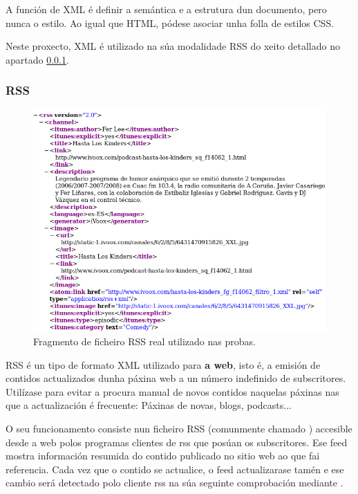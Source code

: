 A función de XML é definir a semántica e a estrutura dun documento, pero nunca o estilo. Ao igual que HTML, pódese asociar unha folla de estilos CSS.

Neste proxecto, XML é utilizado na súa modalidade RSS do xeito detallado no apartado \ref{rss}.

\subsubsection{RSS}
\label{rss}

\begin{figure}[h]
	\centering
	\includegraphics[scale=0.6,keepaspectratio=true]{./images/hlk_rss.png}
	\caption{Fragmento de ficheiro RSS real utilizado nas probas.}
	\label{fig:rss}
\end{figure}

RSS é un tipo de formato XML utilizado para \textbf{a  web}, isto é, a emisión de contidos actualizados dunha páxina web a un número indefinido de subscritores. Utilízase para evitar a procura manual de novos contidos naquelas páxinas nas que a actualización é frecuente: Páxinas de novas, blogs, podcasts... 

O seu funcionamento consiste nun ficheiro RSS (comunmente chamado ) accesible desde a web polos programas clientes de rss que posúan os subscritores. Ese feed mostra información resumida do contido publicado no sitio web ao que fai referencia. Cada vez que o contido se actualice, o feed actualizarase tamén e ese cambio será detectado polo cliente rss na súa seguinte comprobación mediante .
 

